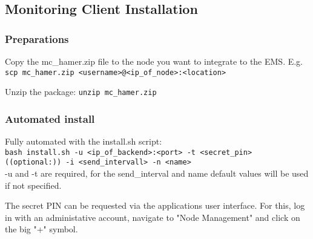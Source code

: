 \documentclass[twoside,a4paper]{refart}
\begin{document}
\subsection{Monitoring Client Installation}
\subsubsection{Preparations}
Copy the mc\_hamer.zip file to the node you want to integrate to the EMS.
E.g. \texttt{scp mc\_hamer.zip <username>@<ip\_of\_node>:<location>}

Unzip the package: \texttt{unzip mc\_hamer.zip}

\subsubsection{Automated install}
Fully automated with the install.sh script:\\
\texttt{bash install.sh -u <ip\_of\_backend>:<port> -t <secret\_pin> \\((optional:)) -i <send\_intervall> -n <name>}\\
-u and -t are required, for the send\_interval and name default values will be used if not specified.

The secret PIN can be requested via the applications user interface. For this, log in with an administative account, navigate to "Node Management" and click on the big "+" symbol.
\end{document}
